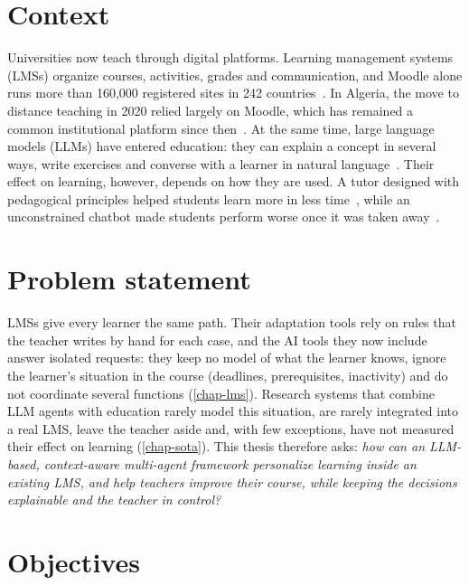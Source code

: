 \label{chap-intro}

\section*{Context}

Universities now teach through digital platforms. Learning management
systems (LMSs) organize courses, activities, grades and communication,
and Moodle alone runs more than 160,000 registered sites in 242
countries~\cite{moodle_stats}. In Algeria, the move to distance teaching
in 2020 relied largely on Moodle, which has remained a common
institutional platform since then~\cite{kerrouzi2023}. At the same time,
large language models (LLMs) have entered education: they can explain a
concept in several ways, write exercises and converse with a learner in
natural language~\cite{wang2024llm4edu,kasneci2023}. Their effect on
learning, however, depends on how they are used. A tutor designed with
pedagogical principles helped students learn more in less
time~\cite{kestin2025}, while an unconstrained chatbot made students
perform worse once it was taken away~\cite{bastani2025}.

\section*{Problem statement}

LMSs give every learner the same path. Their adaptation tools rely on
rules that the teacher writes by hand for each case, and the AI tools
they now include answer isolated requests: they keep no model of what the
learner knows, ignore the learner's situation in the course (deadlines,
prerequisites, inactivity) and do not coordinate several functions
(\cref{chap-lms}). Research systems that combine LLM agents with
education rarely model this situation, are rarely integrated into a real
LMS, leave the teacher aside and, with few exceptions, have not measured
their effect on learning (\cref{chap-sota}). This thesis therefore asks:
\emph{how can an LLM-based, context-aware multi-agent framework
personalize learning inside an existing LMS, and help teachers improve
their course, while keeping the decisions explainable and the teacher in
control?}

\section*{Objectives}

